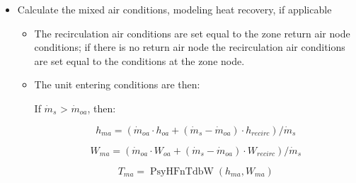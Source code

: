 \begin{itemize}
\begin{itemize}
        \begin{equation}
          {\dot m_s} = {\dot Q_z}/({c_{p,air}}\cdot ({T_s} - {T_z}))
        \end{equation}

      \item If \emph{DehumidCtrlType} = Humidistat (and other conditions are met, see below), then calculate the supply air mass flow rate required to meet the humidistat dehumidification setpoint at \emph{W\(_{min,dehum}\)}

      \item If \emph{HumidCtrlType} = Humidistat (and other conditions are met, see below), then calculate the supply air mass flow rate required to meet the humidistat humidification setpoint at \emph{W\(_{max,humid}\)}

      \item Set the supply air mass flow rate to the greatest of these, but limit to the applicable (heating or cooling) maximum flow rate
    \end{itemize}

  \item Calculate the mixed air conditions, modeling heat recovery, if applicable

    \begin{itemize}
      \item The recirculation air conditions are set equal to the zone return air node conditions; if there is no return air node the recirculation air conditions are set equal to the conditions at the zone node.
      \item The unit entering conditions are then:

        If \({\dot m_s}\) \textgreater{} \({\dot m_{oa}}\), then:

        \begin{equation}
          {h_{ma}} = ({\dot m_{oa}} \cdot {h_{oa}} + ({\dot m_s} - {\dot m_{oa}}) \cdot {h_{recirc}})/{\dot m_s}
        \end{equation}

        \begin{equation}
          {W_{ma}} = ({\dot m_{oa}} \cdot {W_{oa}} + ({\dot m_s} - {\dot m_{oa}}) \cdot {W_{recirc}})/{\dot m_s}
        \end{equation}

        \begin{equation}
          {T_{ma}} = \operatorname{PsyHFnTdbW} ({h_{ma}},{W_{ma}})
        \end{equation}


\end{itemize}
\end{itemize}
